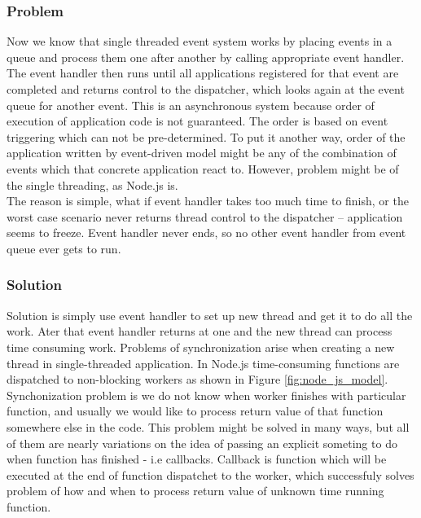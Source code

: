 \subsubsection{Problem} %
\label{ssub:problem}
Now we know that single threaded event system works by placing events in a queue and process them one after another by calling appropriate event handler. The event handler then runs until all applications registered for that event are completed and returns control to the dispatcher, which looks again at the event queue for another event. This is an asynchronous system because order of execution of application code is not guaranteed. The order is based on event triggering which can not be pre-determined. To put it another way, order of the application written by event-driven model might be any of the combination of events which that concrete application react to. However, problem might be of the single threading, as Node.js is.\\
The reason is simple, what if event handler takes too much time to finish, or the worst case scenario never returns thread control to the dispatcher  -- application seems to freeze. Event handler never ends, so no other event handler from event queue ever gets to run.
\subsubsection{Solution} %
\label{ssub:solution}
Solution is simply use event handler to set up new thread and get it to do all the work. Ater that event handler returns at one and the new thread can process time consuming work. Problems of synchronization arise when creating a new thread in single-threaded application. In Node.js time-consuming functions are dispatched to non-blocking workers as shown in Figure \ref{fig:node_js_model}. Synchonization problem is we do not know when worker finishes with particular function, and usually we would like to process return value of that function somewhere else in the code. This problem might be solved in many ways, but all of them are nearly variations on the idea of passing an explicit someting to do when function has finished - i.e callbacks. Callback is function which will be executed at the end of function dispatchet to the worker, which successfuly solves problem of how and when to process return value of unknown time running function.\cite{asynch}




